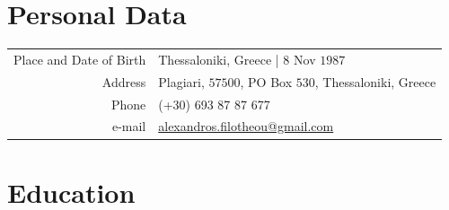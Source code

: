 \documentclass[a4paper,10pt,twoside]{article}
\begin{document}


\par{\bigskip\par}

\section{Personal Data}

\begin{tabular}{rp{10cm}}
Place and Date of Birth 	& Thessaloniki, Greece | $8$ Nov $1987$ \\
Address            			  & Plagiari, $57500$, PO Box $530$, Thessaloniki, Greece \\
Phone						          & (+30) 693 87 87 677 \\
e-mail                    & \href{mailto:alexandros.filotheou@gmail.com}{alexandros.filotheou@gmail.com}
\end{tabular}


\section{Education}
\end{document}
